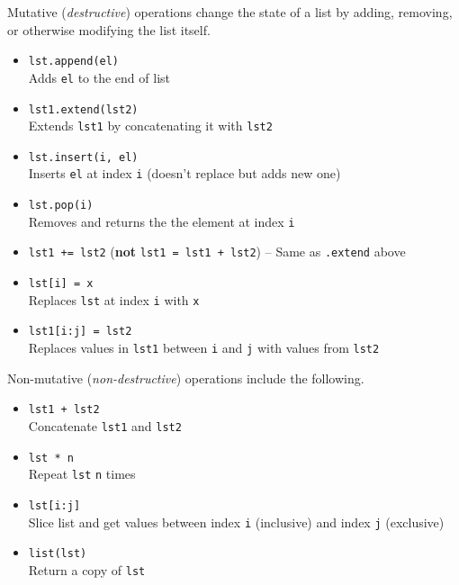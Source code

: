 \begin{blocksection}
Mutative (\emph{destructive}) operations change the state of a list by adding,
removing, or otherwise modifying the list itself.

\begin{itemize}
\item \lstinline$lst.append(el)$ \\ Adds \texttt{el} to the end of list
\item \lstinline$lst1.extend(lst2)$ \\ Extends \texttt{lst1} by concatenating it with \texttt{lst2}
\item \lstinline$lst.insert(i, el)$ \\ Inserts \texttt{el} at index \texttt{i} (doesn't replace but adds new one)
\item \lstinline$lst.pop(i)$ \\ Removes and returns the the element at index \texttt{i}
\item \lstinline$lst1 += lst2$ (\textbf{not} \lstinline$lst1 = lst1 + lst2$) -- Same as \texttt{.extend} above
\item \lstinline$lst[i] = x$ \\ Replaces \texttt{lst} at index \texttt{i} with \texttt{x}
\item \lstinline$lst1[i:j] = lst2$ \\ Replaces values in \texttt{lst1} between \texttt{i} and \texttt{j} with values from \texttt{lst2}
\end{itemize}
\end{blocksection}

\vspace{\parskip}

\begin{blocksection}
Non-mutative (\emph{non-destructive}) operations include the following.
\begin{itemize}
\item \lstinline$lst1 + lst2$ \\ Concatenate \texttt{lst1} and \texttt{lst2}
\item \lstinline$lst * n$ \\ Repeat \texttt{lst} \texttt{n} times
\item \lstinline$lst[i:j]$ \\ Slice list and get values between index \texttt{i} (inclusive) and index \texttt{j} (exclusive)
\item \lstinline$list(lst)$ \\ Return a copy of \texttt{lst}
\end{itemize}
\end{blocksection}

